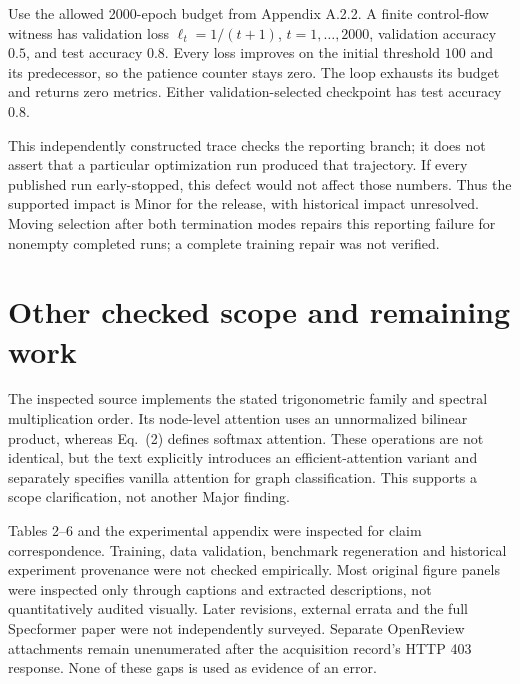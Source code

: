 \documentclass[10pt]{article}
\begin{document}
Use the allowed 2000-epoch budget from Appendix A.2.2. A finite control-flow witness has validation loss \(\ell_t=1/(t+1)\), \(t=1,\ldots,2000\), validation accuracy \(0.5\), and test accuracy \(0.8\). Every loss improves on the initial threshold \(100\) and its predecessor, so the patience counter stays zero. The loop exhausts its budget and returns zero metrics. Either validation-selected checkpoint has test accuracy \(0.8\).\par
This independently constructed trace checks the reporting branch; it does not assert that a particular optimization run produced that trajectory. If every published run early-stopped, this defect would not affect those numbers. Thus the supported impact is Minor for the release, with historical impact unresolved. Moving selection after both termination modes repairs this reporting failure for nonempty completed runs; a complete training repair was not verified.\par
\section*{Other checked scope and remaining work}
The inspected source implements the stated trigonometric family and spectral multiplication order. Its node-level attention uses an unnormalized bilinear product, whereas Eq. (2) defines softmax attention. These operations are not identical, but the text explicitly introduces an efficient-attention variant and separately specifies vanilla attention for graph classification. This supports a scope clarification, not another Major finding.\par
Tables 2–6 and the experimental appendix were inspected for claim correspondence. Training, data validation, benchmark regeneration and historical experiment provenance were not checked empirically. Most original figure panels were inspected only through captions and extracted descriptions, not quantitatively audited visually. Later revisions, external errata and the full Specformer paper were not independently surveyed. Separate OpenReview attachments remain unenumerated after the acquisition record’s HTTP 403 response. None of these gaps is used as evidence of an error.\par
\end{document}
